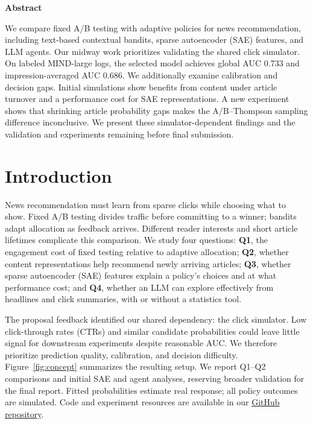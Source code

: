 \documentclass{article}
\renewenvironment{abstract}
{\centerline{\large\bf Abstract}\vspace{-0.06in}%
 \begin{list}{}{\setlength{\leftmargin}{2em}\setlength{\rightmargin}{2em}%
 \setlength{\topsep}{0pt}\setlength{\partopsep}{0pt}%
 \setlength{\parsep}{0pt}\setlength{\itemsep}{0pt}}\item\relax}
{\end{list}}
\begin{document}
\printAffiliationsAndNotice{}

\begin{abstract}
We compare fixed A/B testing with adaptive policies for news recommendation, including text-based contextual bandits, sparse autoencoder (SAE) features, and LLM agents. Our midway work prioritizes validating the shared click simulator. On labeled MIND-large logs, the selected model achieves global AUC 0.733 and impression-averaged AUC 0.686. We additionally examine calibration and decision gaps. Initial simulations show benefits from content under article turnover and a performance cost for SAE representations. A new experiment shows that shrinking article probability gaps makes the A/B--Thompson sampling difference inconclusive. We present these simulator-dependent findings and the validation and experiments remaining before final submission.
\end{abstract}

\section{Introduction}
News recommendation must learn from sparse clicks while choosing what to show. Fixed A/B testing divides traffic before committing to a winner; bandits adapt allocation as feedback arrives. Different reader interests and short article lifetimes complicate this comparison. We study four questions: \textbf{Q1}, the engagement cost of fixed testing relative to adaptive allocation; \textbf{Q2}, whether content representations help recommend newly arriving articles; \textbf{Q3}, whether sparse autoencoder (SAE) features explain a policy's choices and at what performance cost; and \textbf{Q4}, whether an LLM can explore effectively from headlines and click summaries, with or without a statistics tool.

The proposal feedback identified our shared dependency: the click simulator. Low click-through rates (CTRs) and similar candidate probabilities could leave little signal for downstream experiments despite reasonable AUC. We therefore prioritize prediction quality, calibration, and decision difficulty. Figure~\ref{fig:concept} summarizes the resulting setup. We report Q1--Q2 comparisons and initial SAE and agent analyses, reserving broader validation for the final report. Fitted probabilities estimate real response; all policy outcomes are simulated. Code and experiment resources are available in our \href{https://github.com/manassethi/mind-bandits}{GitHub repository}.
\end{document}

